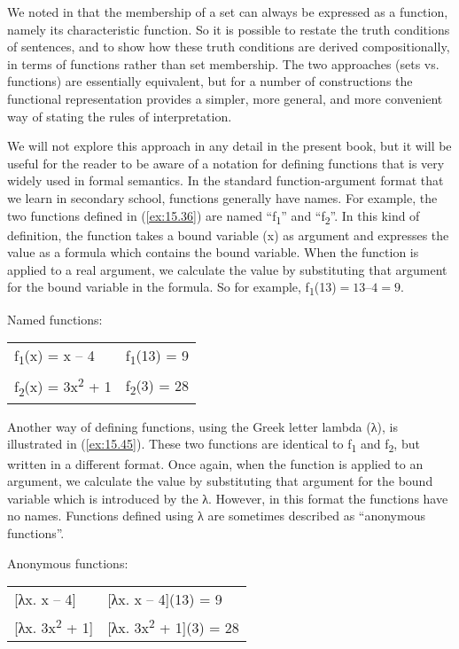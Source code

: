 We noted in  that the membership of a set can always be expressed as a function, namely its characteristic function. So it is possible to restate the truth conditions of sentences, and to show how these truth conditions are derived compositionally, in terms of functions rather than set membership. The two approaches (sets vs. functions) are essentially equivalent, but for a number of constructions the functional representation provides a simpler, more general, and more convenient way of stating the rules of interpretation.



We will not explore this approach in any detail in the present book, but it will be useful for the reader to be aware of a notation for defining functions that is very widely used in formal semantics. In the standard function-argument format that we learn in secondary school, functions generally have names. For example, the two functions defined in (\ref{ex:15.36}) are named “f\textsubscript{1}” and “f\textsubscript{2}”. In this kind of definition, the function takes a bound variable (x) as argument and expresses the value as a formula which contains the bound variable. When the function is applied to a real argument, we calculate the value by substituting that argument for the bound variable in the formula. So for example, f\textsubscript{1}(13)$ = 13 – 4 = 9$.


\ea \label{ex:15.36}
Named functions:\\
\begin{tabular}{ll}
f\textsubscript{1}(x) = x – 4  & f\textsubscript{1}(13) = 9\\
f\textsubscript{2}(x) = 3x\textsuperscript{2} + 1  & f\textsubscript{2}(3) = 28
\end{tabular}
\z



Another way of defining functions, using the {Greek} letter lambda (λ), is illustrated in (\ref{ex:15.45}). These two functions are identical to f\textsubscript{1} and f\textsubscript{2}, but written in a different format. Once again, when the function is applied to an argument, we calculate the value by substituting that argument for the bound variable which is introduced by the λ. However, in this format the functions have no names. Functions defined using λ are sometimes described as “anonymous functions”.

\ea \label{ex:15.45}
Anonymous functions:\\
\begin{tabular}{ll}
{}[λx. x – 4] & [λx. x – 4](13) = 9\\
{}[λx. 3x\textsuperscript{2} + 1] & [λx. 3x\textsuperscript{2} + 1](3) = 28
\end{tabular}
\z 

